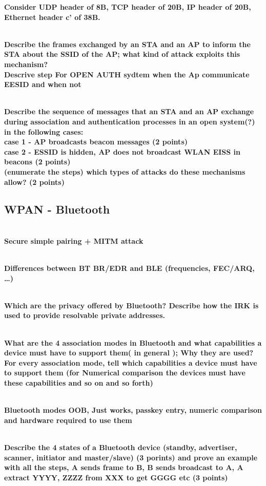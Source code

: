 \textbf{Consider UDP header of 8B, TCP header of 20B, IP header of 20B, Ethernet header c’ of 38B.}


\textbf{\\Describe the frames exchanged by an STA and an AP to inform the STA about the SSID of the AP; what kind of attack exploits this mechanism?}
\textbf{\\Descrive step For OPEN AUTH sydtem when the Ap communicate EESID and when not}

\textbf{\\
Describe the sequence of messages that an STA and an AP exchange during association and authentication processes in an open system(?) in the following cases:\\
case 1 - AP broadcasts beacon messages (2 points)\\
case 2 - ESSID is hidden, AP does not broadcast WLAN EISS in beacons (2 points)\\
(enumerate the steps)
which types of attacks do these mechanisms allow? (2 points) 
}




\subsection{WPAN - Bluetooth}
    
\textbf{\\Secure simple pairing + MITM attack}

\textbf{\\Differences between BT BR/EDR and BLE (frequencies, FEC/ARQ, …)}

\textbf{\\Which are the privacy offered by Bluetooth?   Describe how the IRK is used to provide resolvable private addresses.}


\textbf{\\What are the 4 association modes in Bluetooth and what capabilities a device must have to support them( in general ); Why they are used? For every association mode, tell which capabilities a device must have to support them (for Numerical comparison the devices must have these capabilities and so on and so forth)}

\textbf{\\Bluetooth modes OOB, Just works, passkey entry, numeric comparison and hardware required to use them }

\textbf{\\Describe the 4 states of a Bluetooth device (standby, advertiser, scanner, initiator and master/slave) (3 porints) and prove an example with all the steps, A sends frame to B, B sends broadcast to A, A extract YYYY, ZZZZ from XXX to get GGGG etc (3 points)}


